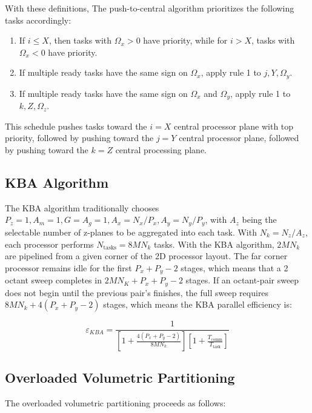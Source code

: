 \documentclass[11pt, letterpaper,titlepage,oneside]{article}
\begin{document}
With these definitions, The push-to-central algorithm prioritizes the following tasks accordingly:
\begin{enumerate}
\item If $i \leq X$, then tasks with $\Omega_x > 0$ have priority, while for $i > X$, tasks with $\Omega_x < 0$ have priority.
\item If multiple ready tasks have the same sign on $\Omega_x$, apply rule 1 to $j,Y,\Omega_y$.
\item If multiple ready tasks have the same sign on $\Omega_x$ and $\Omega_y$, apply rule 1 to $k,Z, \Omega_z$.
\end{enumerate}
This schedule pushes tasks toward the $i = X$ central processor plane with top priority, followed by pushing toward the $j = Y$ central processor plane, followed by pushing toward the $k = Z$ central processing plane\cite{mpadams2013}.

\subsection*{KBA Algorithm}

The KBA algorithm traditionally chooses $P_z = 1, A_m = 1, G = A_g = 1, A_x = N_x/P_x, A_y = N_y/P_y$, with $A_z$ being the selectable number of z-planes to be aggregated into each task. With $N_k = N_z/A_z$, each processor performs $N_{\text{tasks}} = 8MN_k$ tasks. With the KBA algorithm, $2MN_k$ are pipelined from a given corner of the 2D processor layout. The far corner processor remains idle for the first $P_x + P_y - 2 $ stages, which means that a 2 octant sweep completes in $2MN_K + P_x + P_y - 2$ stages. If an octant-pair sweep does not begin until the previous pair's finishes, the full sweep requires $8MN_k + 4(P_x+P_y-2)$ stages, which means the KBA parallel efficiency is:

\begin{equation}
\varepsilon_{KBA} = \frac{1}{[1+\frac{4(P_x+P_y-2)}{8MN_k}][1+\frac{T_{\text{comm}}}{T_{\text{task}}}]}
\label{eKBA}
\end{equation}

\subsection*{Overloaded Volumetric Partitioning}

The overloaded volumetric partitioning proceeds as follows:
\end{document}
